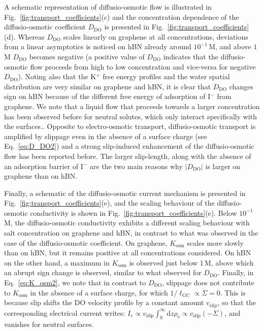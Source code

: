 \documentclass[journal=ancac3,manuscript=article,layout=twocolumn]{achemso}
\newcommand{\lGC}{\ell_\text{GC}}
\newcommand{\rhoe}{\rho_\text{e}}
\begin{document}
A schematic representation of diffusio-osmotic
flow is illustrated in
Fig.~\ref{fig:transport_coefficients}(c) and
the concentration dependence of the
diffusio-osmotic coefficient $D_{\text{DO}}$
is presented in Fig.~\ref{fig:transport_coefficients}(d).
Whereas $D_\mathrm{DO}$ scales linearly
on graphene at all concentrations, deviations from
a linear asymptotics is noticed
on hBN already around $10^{-1}$\,M, and  above
 $1$\,M $D_\mathrm{DO}$ becomes negative (a positive value of $D_\mathrm{DO}$ indicates that the
diffusio-osmotic flow proceeds from high to low
concentration and vice-versa for negative $D_\mathrm{DO}$). Noting also that the K$^{+}$
free energy profiles
and the water spatial distribution
are very similar on graphene and hBN,
it is clear that $D_\mathrm{DO}$
changes sign on hBN because of the
different free energy of adsorption of I$^{-}$
from graphene.
We note that a liquid flow that proceeds
towards a larger concentration
has been observed before for neutral solutes,
which only interact specifically with the surfaces.\cite{Lee2014b,Lee2017}.
Opposite to electro-osmotic transport,
diffusio-osmotic transport is amplified
by slippage even in the absence of a surface
charge (see Eq.~\ref{eq:D_DO2}) and
a strong slip-induced enhancement of
the diffusio-osmotic flow
has been reported before\cite{Ajdari2006}.
 The larger slip-length, along with the
  absence of an adsorption barrier
of I$^{-}$ are the two main reasons
why $|D_\mathrm{DO}|$ is larger on graphene than on hBN.

Finally, a schematic
of the diffusio-osmotic
current mechanism is presented in
Fig.~\ref{fig:transport_coefficients}(e),
and the  scaling behaviour of the diffusio-osmotic
conductivity is shown in Fig.~\ref{fig:transport_coefficients}(e).
Below $10^{-1}$\,M, the diffusio-osmotic conductivity
exhibits a different scaling behaviour
with salt concentration on graphene
and hBN, in contrast to what was observed in the
case of the diffusio-osmotic coefficient.
On graphene, $K_\mathrm{osm}$
scales more slowly than on hBN, but it
remains positive at all concentrations considered.
On hBN on the other hand, a maximum in $K_\mathrm{osm}$ is observed
just below 1\,M, above which an abrupt sign change is
observed, similar to what observed for $D_\mathrm{DO}$.
Finally, in Eq.~\eqref{eq:K_osm2},  we note that in contrast to
$D_\mathrm{DO}$, slippage does not contribute to $K_\mathrm{osm}$
in the absence of a surface charge, for which $1/\lGC \propto \Sigma = 0$.
This is because slip shifts the DO velocity profile by a constant amount $v_\text{slip}$, so that the corresponding electrical current writes: $I_e \propto v_\text{slip} \int_0^\infty \mathrm{d}z \rhoe \propto v_\text{slip} (-\Sigma)$, and vanishes for neutral surfaces.
\end{document}
